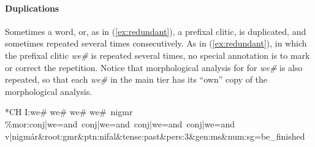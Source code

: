 \paragraph{Duplications}
Sometimes a word, or, as in (\ref{ex:redundant}), a prefixal clitic, 
is duplicated, and sometimes repeated
several times consecutively. As in (\ref{ex:redundant}), in which the prefixal clitic \textit{we\#} is 
repeated several times, no special annotation is to mark or correct the repetition. Notice that morphological analysis for
for \textit{we\#} is also repeated, so that each \textit{we\#} in the main tier has its ``own'' copy of the morphological analysis.
\begin{exe} \label{ex:redundant}
\ex \textsf{*\ac{CH} I:\quad we\# we\# we\# we\#\, nigmr } \\
   \textsf{\%mor:\quad conj|we=and\, conj|we=and\, conj|we=and\, conj|we=and} \\
   \textsf{v|nigm\'ar\&root:gmr\&ptn:nifal\&tense:past\&pers:3\&gen:ms\&num:sg=be\_finished }
\end{exe}

 
